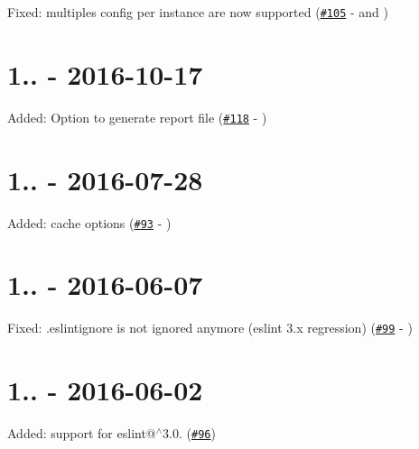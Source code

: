 \begin{DoxyItemize}
\item Fixed\+: multiples config per instance are now supported (\href{https://github.com/MoOx/eslint-loader/issues/105}{\tt \#105} -\/  and )
\end{DoxyItemize}

\section*{1.. -\/ 2016-\/10-\/17}


\begin{DoxyItemize}
\item Added\+: Option to generate report file (\href{https://github.com/MoOx/eslint-loader/pull/118}{\tt \#118} -\/ )
\end{DoxyItemize}

\section*{1.. -\/ 2016-\/07-\/28}


\begin{DoxyItemize}
\item Added\+: {\ttfamily cache} options (\href{https://github.com/MoOx/eslint-loader/pull/93}{\tt \#93} -\/ )
\end{DoxyItemize}

\section*{1.. -\/ 2016-\/06-\/07}


\begin{DoxyItemize}
\item Fixed\+: .eslintignore is not ignored anymore (eslint 3.\+x regression) (\href{https://github.com/MoOx/eslint-loader/pull/99}{\tt \#99} -\/ )
\end{DoxyItemize}

\section*{1.. -\/ 2016-\/06-\/02}


\begin{DoxyItemize}
\item Added\+: support for eslint@$^\wedge$3.0. (\href{https://github.com/MoOx/eslint-loader/issues/96}{\tt \#96})
\end{DoxyItemize}

